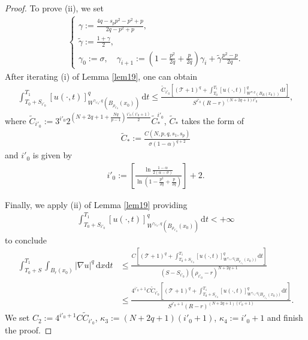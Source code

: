 \documentclass[reqno,10pt]{amsart}
\numberwithin{equation}{section}
\begin{document}
\begin{proof}
	To prove (ii), we set
	\begin{align*}
		\begin{cases}
			\gamma:=\frac{4q-s_pp^2-p^2+p}{2q-p^2+p},\\
			\tilde{\gamma}:=\frac{1+\gamma}{2},\\
			\gamma_0:=\sigma,\quad \gamma_{i+1}:=\left( 1-\frac{p^2}{2q}+\frac{p}{2q}\right)\gamma_i+\tilde{\gamma}\frac{p^2-p}{2q}.
		\end{cases}
	\end{align*}
	After iterating (i) of Lemma \ref{lem19}, one can obtain
	\begin{align}
		\label{20.1}
		\int_{T_0+S_{i'_0}}^{T_1}[u(\cdot,t)]^q_{W^{\gamma_{i'_{0}},q}\left(B_{\rho_{i'_0}}(x_0)\right)}\,\mathrm{d}t\le \frac{\widetilde{C}_{i'_0}\left[\left(\mathcal{T}+1\right)^q+\int_{T_0}^{T_1}[u(\cdot,t)]^q_{W^{\sigma,q}\left( B_R(x_0)\right)}\mathrm{d}t\right]}{S^{i'_0}(R-r)^{(N+2q+1)i'_0}},
	\end{align}
	where $\widetilde{C}_{i'_0}:=3^{i'_0}2^{\left(N+2q+1+\frac{Nq}{p-1}\right)\frac{i'_0(i'_0+1)}{2} }\widetilde{C}^{i'_0}_*$, $\widetilde{C}_*$ takes the form of
	\begin{align*}
		\widetilde{C}_*:=\frac{C(N,p,q,s_1,s_p)}{\sigma(1-\alpha)^{q+2}}
	\end{align*}
	and $i'_0$ is given by
	\begin{align*}
		i'_0:=\left[\frac{\ln\frac{1-\alpha}{2(\alpha-\sigma)}}{\ln\left(1-\frac{p^2}{2q}+\frac{p}{2q}\right)}\right]+2. 
	\end{align*}
	
	Finally, we apply (ii) of Lemma \ref{lem19} providing
	\begin{align*}
		\int_{T_0+S_{i'_0}}^{T_1}[u(\cdot,t)]^q_{W^{\gamma_{i'_{0}},q}\left(B_{\rho_{i'_0}}(x_0)\right)}\,\mathrm{d}t<+\infty
	\end{align*}
	to conclude
	\begin{align*}
		\int_{T_0+S}^{T_1}\int_{B_r(x_0)}|\nabla u|^q\,\mathrm{d}x\mathrm{d}t&\le\frac{C\left[\left(\mathcal{T}+1\right)^q+\int_{T_0+S_{i'_0}}^{T_1}[u(\cdot,t)]^q_{W^{\gamma_{i'_{0}},q}\bigl(B_{\rho_{i'_0}}(x_0)\bigl)}\,\mathrm{d}t\right]}{(S-S_{i'_0})(\rho_{i'_0}-r)^{N+2q+1}}\\
		&\le \frac{4^{i'_0+1}C\widetilde{C}_{i'_0}\left[\left(\mathcal{T}+1\right)^q+\int_{T_0+S_{i'_0}}^{T_1}[u(\cdot,t)]^q_{W^{\gamma_{i'_{0}},q}\bigl(B_{\rho_{i'_0}}(x_0)\bigl)}\,\mathrm{d}t\right]}{S^{i'_0+1}(R-r)^{(N+2q+1)(i'_0+1)}}.
	\end{align*}
	We set $C_2:=4^{i'_0+1}C\widetilde{C}_{i'_0}$, $\kappa_3:=(N+2q+1)(i'_0+1)$, $\kappa_4:=i'_0+1$ and finish the proof.
\end{proof}
\end{document}
